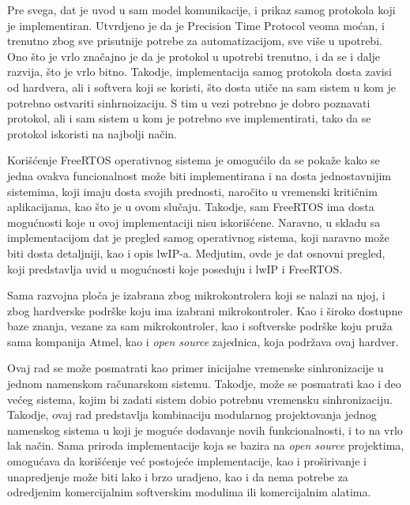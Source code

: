 \documentclass[a4paper,12pt, master]{etf}
\begin{document}
	Pre svega, dat je uvod u sam model komunikacije, i prikaz samog protokola
	koji je implementiran. Utvrdjeno je da je Precision Time Protocol veoma
	mo\'{c}an, i trenutno zbog sve prisutnije potrebe za automatizacijom, sve
	vi\v{s}e u upotrebi. Ono \v{s}to je vrlo zna\v{c}ajno je da je protokol u
	upotrebi trenutno, i da se i dalje razvija, \v{s}to je vrlo bitno. Takodje,
	implementacija samog protokola dosta zavisi od hardvera, ali i softvera
	koji se koristi, \v{s}to dosta uti\v{c}e na sam sistem u kom je potrebno
	ostvariti sinhrnoizaciju. S tim u vezi potrebno je dobro poznavati protokol,
	 ali i sam sistem u kom je potrebno sve implementirati, tako da se protokol
	iskoristi na najbolji na\v{c}in.

	Kori\v{s}\'{c}enje FreeRTOS operativnog sistema je omogu\'{c}ilo da se
	poka\v{z}e kako se jedna ovakva funcionalnost mo\v{z}e biti implementirana
	i na dosta jednostavnijim sistemima, koji imaju dosta svojih prednosti,
	naro\v{c}ito u vremenski kriti\v{c}nim aplikacijama, kao \v{s}to je u ovom
	slu\v{c}aju. Takodje, sam FreeRTOS ima dosta mogu\'{c}nosti koje u ovoj
	implementaciji nisu iskori\v{s}\'{c}ene. Naravno, u skladu sa
	implementacijom dat je pregled samog operativnog sistema, koji naravno
	mo\v{z}e biti dosta detaljniji, kao i opis lwIP-a. Medjutim, ovde je dat
	osnovni pregled, koji predstavlja uvid u mogu\'{c}nosti koje poseduju i lwIP
    i FreeRTOS.

	Sama razvojna plo\v{c}a je izabrana zbog mikrokontrolera koji se nalazi na
	njoj, i zbog hardverske podr\v{s}ke koju ima izabrani mikrokontroler. Kao i
	\v{s}iroko dostupne baze znanja, vezane za sam mikrokontroler, kao i
	softverske podr\v{s}ke koju pru\v{z}a sama kompanija Atmel, kao i
	\textit{open source} zajednica, koja podr\v{z}ava ovaj hardver.

	Ovaj rad se mo\v{z}e posmatrati kao primer inicijalne vremenske
	sinhronizacije u jednom namenskom ra\v{c}unarskom sistemu. Takodje,
	mo\v{z}e se posmatrati kao i deo ve\'{c}eg sistema, kojim bi zadati sistem
	dobio potrebnu vremensku sinhronizaciju. Takodje, ovaj rad predstavlja
	kombinaciju modularnog projektovanja jednog namenskog sistema u koji je
	mogu\'{c}e dodavanje novih funkcionalnosti, i to na vrlo lak na\v{c}in.
	Sama priroda implementacije koja se bazira na \textit{open source}
	projektima, omogu\'{c}ava da kori\v{s}\'{c}enje	ve\'{c} postoje\'{c}e
	implementacije, kao i pro\v{s}irivanje i unapredjenje mo\v{z}e biti lako i
	brzo uradjeno, kao i da nema potrebe za odredjenim komercijalnim
	softverskim modulima ili komercijalnim alatima.
\end{document}

